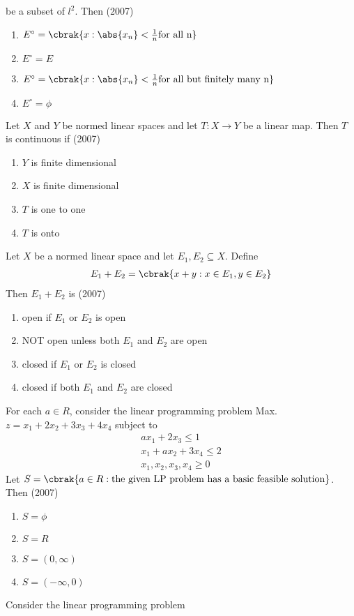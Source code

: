 	     be a subset of $l^2$. Then
	     \hfill{(2007)}
                \begin{enumerate}
			\item $E^{\circ}=\cbrak{x:\abs{x_{n}}<\frac{1}{n} \text{for all n}}$
			\item $E^{\circ}=E$
			\item $E^{\circ}=\cbrak{x:\abs{x_{n}}<\frac{1}{n} \text{for all but finitely many n}}$
			\item $E^{\circ}=\phi$
        	\end{enumerate}		
	\item Let $X$ and $Y$ be normed linear spaces and let $T: X \rightarrow Y$ be a linear map. Then $T$ is continuous if
	\hfill{(2007)}
		\begin{enumerate}
			\item $Y$ is finite dimensional
			\item $X$ is finite dimensional
			\item $T$ is one to one
			\item $T$ is onto
        	\end{enumerate}	
	\item Let $X$ be a normed linear space and let $E_{1}, E_{2} \subseteq X$. Define
           \begin{align*}
		E_{1}+E_{2}=\cbrak{x+y: x \in E_{1}, y \in E_{2}} 
             \end{align*}
             Then $E_{1}+E_{2}$ is
             \hfill{(2007)}
		\begin{enumerate}
			\item open if $E_{1}$ or $E_{2}$ is open
			\item NOT open unless both $E_{1}$ and $E_{2}$ are open
			\item closed if $E_{1}$ or $E_{2}$ is closed
			\item closed if both $E_{1}$ and $E_{2}$ are closed
        	\end{enumerate}	
	\item For each $a \in R$, consider the linear programming problem Max. $z=x_{1}+2 x_{2}+3 x_{3}+4 x_{4}$
subject to 
           \begin{align*}	
 a x_{1}+2 x_{3} \leq 1 \\
 x_{1}+a x_{2}+3 x_{4} \leq 2 \\
 x_{1}, x_{2}, x_{3}, x_{4} \geq 0
             \end{align*} 
	     Let $S=\cbrak{a \in R : \text{the given LP problem has a basic feasible solution} }$. Then
	     \hfill{(2007)}
		\begin{enumerate}
			\item $S=\phi$
			\item $S=R$
			\item $S=(0, \infty)$
			\item $S=(-\infty, 0)$
        	\end{enumerate}	
	\item Consider the linear programming problem

